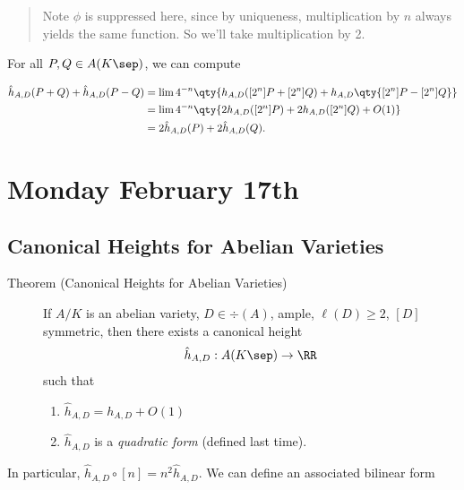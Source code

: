 \begin{description}
\begin{quote}
Note \(\phi\) is suppressed here, since by uniqueness, multiplication by
\(n\) always yields the same function. So we'll take multiplication by
2.
\end{quote}

For all \(P, Q \in A(K\sep)\), we can compute

\begin{align*}
\hat h_{A, D}(P + Q) + \hat h_{A, D}(P-Q) 
&=
\lim 4^{-n} \qty{ h_{A,D}([2^n]P + [2^n]Q) + h_{A, D}\qty{ [2^n]P - [2^n]Q  }  } \\
&=
\lim 4^{-n} \qty{ 2 h_{A,D}([2^n]P) + 2 h_{A, D}([2^n]Q) + O(1) } \\
&=
2 \hat h_{A, D}(P) + 2\hat h_{A, D}(Q)
.\end{align*}
\end{description}

\hypertarget{monday-february-17th}{%
\section{Monday February 17th}\label{monday-february-17th}}

\hypertarget{canonical-heights-for-abelian-varieties}{%
\subsection{Canonical Heights for Abelian
Varieties}\label{canonical-heights-for-abelian-varieties}}

\begin{description}
\item[Theorem (Canonical Heights for Abelian Varieties)]
If \(A/K\) is an abelian variety, \(D\in \div(A)\), ample,
\(\ell(D) \geq 2\), \([D]\) symmetric, then there exists a canonical
height
\begin{align*}\hat h_{A, D}: A(K\sep) \to \RR\end{align*} such that

\begin{enumerate}
\def\labelenumi{\arabic{enumi}.}
\tightlist
\item
  \(\hat h_{A, D} = h_{A, D} + O(1)\)
\item
  \(\hat h_{A, D}\) is a \emph{quadratic form} (defined last time).
\end{enumerate}
\end{description}

In particular, \(\hat h_{A, D} \circ [n] = n^2 \hat h_{A, D}\). We can
define an associated bilinear form

